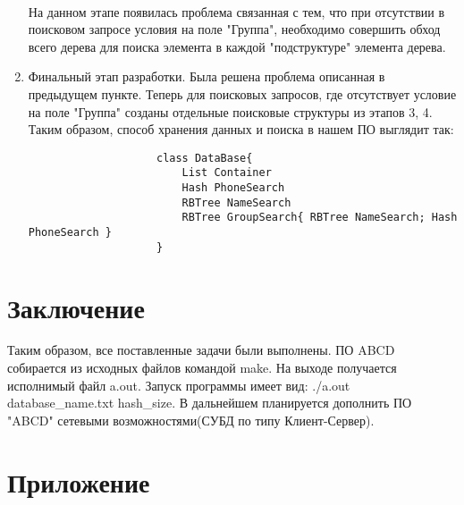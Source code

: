 \documentclass[a4paper, 14pt]{extreport}
\begin{document}
\begin{enumerate}
				\\ На данном этапе появилась проблема связанная с тем, что при отсутствии в поисковом запросе условия на поле "Группа", необходимо совершить обход всего дерева для поиска элемента в каждой "подструктуре" элемента дерева.
				\item Финальный этап разработки. Была решена проблема описанная в предыдущем пункте. Теперь для поисковых запросов, где отсутствует условие на поле "Группа" созданы отдельные поисковые структуры из этапов 3, 4. Таким образом, способ хранения данных и поиска в нашем ПО выглядит так:
					\begin{verbatim}
					class DataBase{
					    List Container
					    Hash PhoneSearch
					    RBTree NameSearch
					    RBTree GroupSearch{ RBTree NameSearch; Hash PhoneSearch }
					}
					\end{verbatim}
				
		 	\end{enumerate}
	 	
	 	\newpage
	 	\section{Заключение}
	 	Таким образом, все поставленные задачи были выполнены. ПО ABCD собирается из исходных файлов командой make. На выходе получается исполнимый файл a.out. Запуск программы имеет вид: ./a.out database\_name.txt hash\_size. В дальнейшем планируется дополнить ПО "ABCD" сетевыми возможностями(СУБД по типу Клиент-Сервер).
	 	
	 	\newpage
	 	\section{Приложение}

	
	
		
\end{document}
